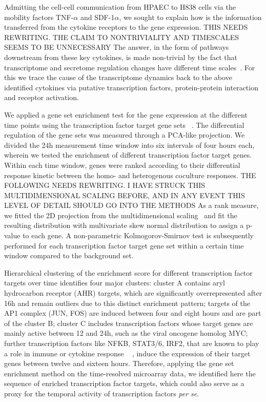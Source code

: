Admitting the cell-cell communication from HPAEC to H838 cells 
via the  mobility factors TNF-$\alpha$ and SDF-1$\alpha$,
we sought to explain how is the
information transferred from the cytokine receptors to the gene expression. 
THIS NEEDS REWRITING. THE CLAIM TO NONTRIVIALITY AND TIMESCALES SEEMS TO BE
UNNECESSARY
The answer, in the form of pathways downstream from these key  cytokines, is made non-trivial by the fact that
transcriptome and secretome regulation changes have different time scales~\cite{Busch2008}. 
For this we trace the cause of the transcriptome dynamics back to the above identified cytokines via putative transcription factors, protein-protein interaction
and receptor activation. 

We applied a gene set enrichment test for the gene expression at 
the different time points using the transcription factor target gene sets~%
\cite{msigdb}.
The differential regulation of the gene sets was measured through
a PCA-like projection. We divided the 24h measurement time window 
into six intervals of four hours each,
wherein  we tested the enrichment of different 
transcription factor target genes. Within each time window, 
genes were ranked according to their differential response
kinetic between the homo- and heterogenous coculture responses. 
THE FOLLOWING NEEDS REWRITING. I HAVE STRUCK THIS MULTIDIMENSIONAL SCALING
BEFORE, AND IN ANY EVENT THIS LEVEL OF DETAIL SHOULD GO INTO THE METHODS
As a rank measure, we fitted the 2D projection from the multidimensional 
scaling~\cite{Strickert2009} and fit the resulting distribution with multivariate 
skew 
normal distribution to assign a p-value to each gene. %
A non-parametric Kolmogorov-Smirnov test is subsequently performed for each
transcription factor target gene set within a certain time window compared to the 
background set.

Hierarchical clustering of the enrichment score for different transcription 
factor targets
over time identifies four  major clusters: cluster A contains aryl 
hydrocarbon receptor (AHR) targets, which  are significantly
overrepresented after 16h and remain outliers due to this distinct 
enrichment pattern; 
targets of the AP1 complex (JUN, FOS) are induced between 
four and eight hours and
are part of the cluster B; cluster C includes transcription factors 
whose target genes are mainly 
active between 12 and 24h, such as the viral oncogene homolog MYC;
further transcription factors like  NFKB, STAT3/6, IRF2, 
that are known to play a role in
immune or cytokine response ~\cite{Hayden2008,Shuai2003,Wang2002} ,
induce the expression of their target genes
between twelve and sixteen hours. Therefore, applying the gene set
enrichment method on the time-resolved microarray data, we identified here the
sequence of enriched transcription factor targets, which could also serve as
a proxy for the temporal activity of transcription factors \emph{per se}.

